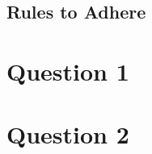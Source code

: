 \documentclass[a4paper]{article}
\begin{document}
\subsection*{Rules to Adhere}


\newpage
\section*{Question 1}



\newpage
\section*{Question 2}



\end{document}
